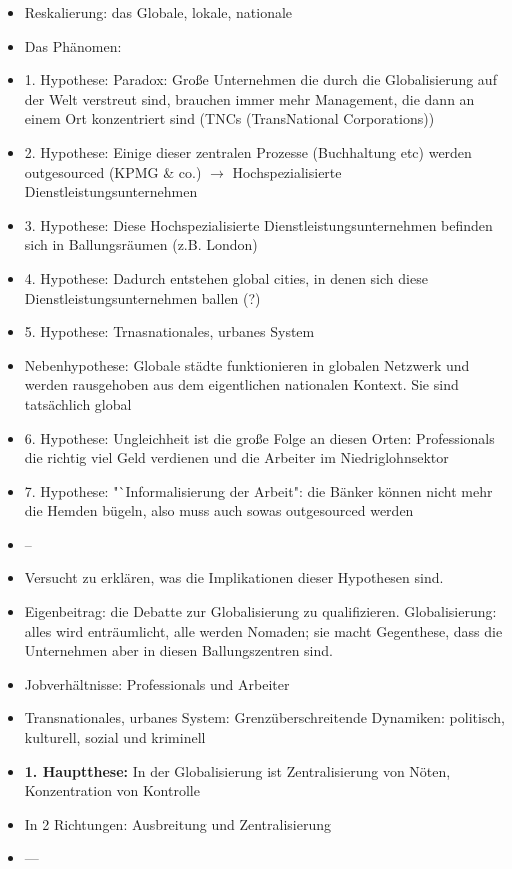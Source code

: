 \documentclass[emulatestandardclasses]{scrartcl}
\begin{document}
\begin{itemize}
  \item Reskalierung: das Globale, lokale, nationale
  \item Das Phänomen:
  \item 1. Hypothese: Paradox: Große Unternehmen die durch die Globalisierung auf der Welt verstreut sind, brauchen immer mehr Management, die dann an einem Ort konzentriert sind (TNCs (TransNational Corporations))
  \item 2. Hypothese: Einige dieser zentralen Prozesse (Buchhaltung etc) werden outgesourced (KPMG \& co.) $\rightarrow$ Hochspezialisierte Dienstleistungsunternehmen
  \item 3. Hypothese: Diese Hochspezialisierte Dienstleistungsunternehmen befinden sich in Ballungsräumen (z.B. London)
  \item 4. Hypothese: Dadurch entstehen global cities, in denen sich diese Dienstleistungsunternehmen ballen (?)
  \item 5. Hypothese: Trnasnationales, urbanes System
  \item Nebenhypothese: Globale städte funktionieren in globalen Netzwerk und werden rausgehoben aus dem eigentlichen nationalen Kontext. Sie sind tatsächlich global
  \item 6. Hypothese: Ungleichheit ist die große Folge an diesen Orten: Professionals die richtig viel Geld verdienen und die Arbeiter im Niedriglohnsektor
  \item 7. Hypothese: "`Informalisierung der Arbeit": die Bänker können nicht mehr die Hemden bügeln, also muss auch sowas outgesourced werden
  \item --
  \item Versucht zu erklären, was die Implikationen dieser Hypothesen sind.
  \item Eigenbeitrag: die Debatte zur Globalisierung zu qualifizieren. Globalisierung: alles wird enträumlicht, alle werden Nomaden; sie macht Gegenthese, dass die Unternehmen aber in diesen Ballungszentren sind.
  \item Jobverhältnisse: Professionals und Arbeiter
  \item Transnationales, urbanes System: Grenzüberschreitende Dynamiken: politisch, kulturell, sozial und kriminell
  \item \textbf{1. Hauptthese:} In der Globalisierung ist Zentralisierung von Nöten, Konzentration von Kontrolle
  \item In 2 Richtungen: Ausbreitung und Zentralisierung
  \item ---

\end{itemize}
\end{document}
